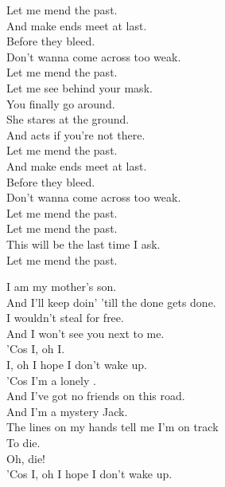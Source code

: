 Let me mend the past. \\
And make ends meet at last. \\
Before they bleed. \\
Don't wanna come across too weak. \\

Let me mend the past. \\
Let me see behind your mask. \\
You finally go around. \\
She stares at the ground. \\
And acts if you're not there. \\

Let me mend the past. \\
And make ends meet at last. \\
Before they bleed. \\
Don't wanna come across too weak. \\

Let me mend the past. \\
Let me mend the past. \\
This will be the last time I ask. \\
Let me mend the past. \\





I am my mother's son. \\
And I'll keep doin' 'till the done gets done. \\
I wouldn't steal for free. \\
And I won't see you next to me. \\

'Cos I, oh I. \\
I, oh I hope I don't wake up. \\

'Cos I'm a lonely . \\
And I've got no friends on this road. \\
And I'm a mystery Jack. \\
The lines on my hands tell me I'm on track \\

To die. \\
Oh, die! \\
'Cos I, oh I hope I don't wake up. \\

